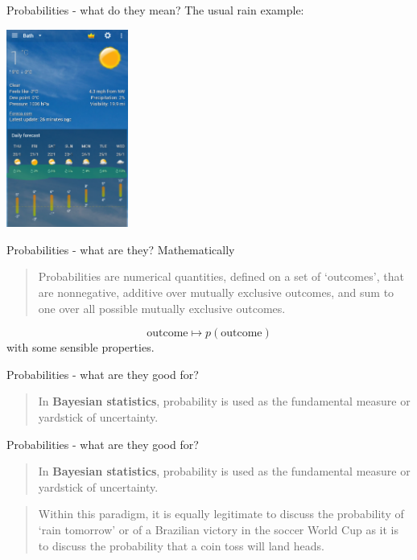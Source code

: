 \documentclass{beamer}
\newcommand{\cor}{\color{reddish}{}}
\newcommand{\cob}{\color{black}{}}
\begin{document}
\begin{frame}{Probabilities - what do they mean?}
The usual rain example:
  \begin{center}
    \includegraphics[width=4cm]{rain2.png}
\end{center}
\end{frame}

\begin{frame}{Probabilities - what are they?}
Mathematically
  \begin{quote}
    Probabilities are numerical quantities, defined on a set of
    `outcomes', that are nonnegative, additive over mutually exclusive
    outcomes, and sum to one over all possible mutually exclusive
    outcomes.
  \end{quote}
  \cor
  $$\mbox{outcome}\mapsto p(\mbox{outcome})$$
  \cob
  with some sensible properties.
\end{frame}

\begin{frame}{Probabilities - what are they good for?}
\begin{quote}
In \textbf{Bayesian statistics}, probability is used as the fundamental measure or yardstick of
uncertainty.
\end{quote}
\end{frame}

\begin{frame}{Probabilities - what are they good for?}
\begin{quote}
In \textbf{Bayesian statistics}, probability is used as the fundamental measure or yardstick of
uncertainty.
\end{quote}
\begin{quote}
Within this paradigm, it is equally legitimate to discuss the probability of
`rain tomorrow' or of a Brazilian victory in the soccer World Cup as it is to discuss the
probability that a coin toss will land heads.
\end{quote}
\end{frame}
\end{document}
